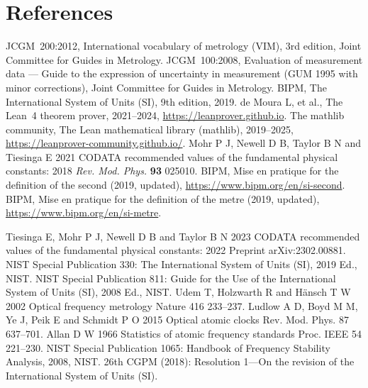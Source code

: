 \documentclass[11pt]{article}
\theoremstyle{plain}
\theoremstyle{definition}
\theoremstyle{remark}
\begin{document}
\section*{References}
\begin{thebibliography}{9}
 JCGM~200:2012, International vocabulary of metrology (VIM), 3rd edition, Joint Committee for Guides in Metrology.
 JCGM~100:2008, Evaluation of measurement data — Guide to the expression of uncertainty in measurement (GUM 1995 with minor corrections), Joint Committee for Guides in Metrology.
 BIPM, The International System of Units (SI), 9th edition, 2019.
 de Moura L, et al., The Lean~4 theorem prover, 2021--2024, \url{https://leanprover.github.io}.
 The mathlib community, The Lean mathematical library (mathlib), 2019--2025, \url{https://leanprover-community.github.io/}.
 Mohr P J, Newell D B, Taylor B N and Tiesinga E 2021 CODATA recommended values of the fundamental physical constants: 2018 \textit{Rev. Mod. Phys.} \textbf{93} 025010.
 BIPM, Mise en pratique for the definition of the second (2019, updated), \url{https://www.bipm.org/en/si-second}.
 BIPM, Mise en pratique for the definition of the metre (2019, updated), \url{https://www.bipm.org/en/si-metre}.

 Tiesinga E, Mohr P J, Newell D B and Taylor B N 2023 CODATA recommended values of the fundamental physical constants: 2022 Preprint arXiv:2302.00881.
 NIST Special Publication 330: The International System of Units (SI), 2019 Ed., NIST.
 NIST Special Publication 811: Guide for the Use of the International System of Units (SI), 2008 Ed., NIST.
 Udem T, Holzwarth R and Hänsch T W 2002 Optical frequency metrology Nature 416 233–237.
 Ludlow A D, Boyd M M, Ye J, Peik E and Schmidt P O 2015 Optical atomic clocks Rev. Mod. Phys. 87 637–701.
 Allan D W 1966 Statistics of atomic frequency standards Proc. IEEE 54 221–230.
 NIST Special Publication 1065: Handbook of Frequency Stability Analysis, 2008, NIST.
 26th CGPM (2018): Resolution 1—On the revision of the International System of Units (SI).

\end{thebibliography}
\end{document}
